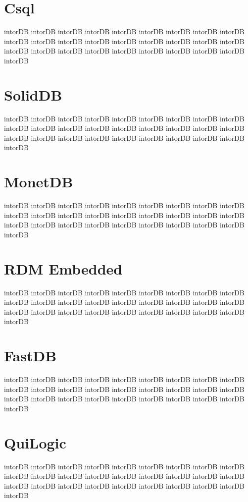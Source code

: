 		\section{Csql}
		intorDB intorDB intorDB intorDB intorDB intorDB intorDB 
		intorDB intorDB intorDB intorDB intorDB intorDB intorDB 
		intorDB intorDB intorDB intorDB intorDB intorDB intorDB 
		intorDB intorDB intorDB intorDB intorDB intorDB intorDB 
		
		\section{SolidDB}
		intorDB intorDB intorDB intorDB intorDB intorDB intorDB 
		intorDB intorDB intorDB intorDB intorDB intorDB intorDB 
		intorDB intorDB intorDB intorDB intorDB intorDB intorDB 
		intorDB intorDB intorDB intorDB intorDB intorDB intorDB 
		
		\section{MonetDB}
		intorDB intorDB intorDB intorDB intorDB intorDB intorDB 
		intorDB intorDB intorDB intorDB intorDB intorDB intorDB 
		intorDB intorDB intorDB intorDB intorDB intorDB intorDB 
		intorDB intorDB intorDB intorDB intorDB intorDB intorDB 
		
		\section{RDM Embedded}
		intorDB intorDB intorDB intorDB intorDB intorDB intorDB 
		intorDB intorDB intorDB intorDB intorDB intorDB intorDB 
		intorDB intorDB intorDB intorDB intorDB intorDB intorDB 
		intorDB intorDB intorDB intorDB intorDB intorDB intorDB 
		
		\section{FastDB}
		intorDB intorDB intorDB intorDB intorDB intorDB intorDB 
		intorDB intorDB intorDB intorDB intorDB intorDB intorDB 
		intorDB intorDB intorDB intorDB intorDB intorDB intorDB 
		intorDB intorDB intorDB intorDB intorDB intorDB intorDB 
		
		\section{QuiLogic}
		intorDB intorDB intorDB intorDB intorDB intorDB intorDB 
		intorDB intorDB intorDB intorDB intorDB intorDB intorDB 
		intorDB intorDB intorDB intorDB intorDB intorDB intorDB 
		intorDB intorDB intorDB intorDB intorDB intorDB intorDB 
		
